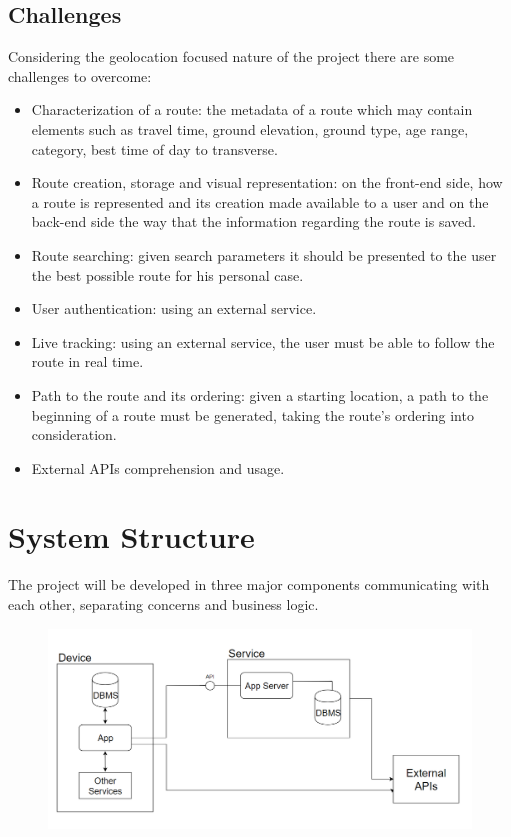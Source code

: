 \documentclass{article}
\begin{document}
        \subsection{Challenges}
            
            Considering the geolocation focused nature of the project there are some challenges to overcome:

            \begin{itemize}
                \item Characterization of a route: the metadata of a route which may contain elements such as travel time, ground elevation, ground type, age range, category, best time of day to transverse.
                \item Route creation, storage and visual representation: on the front-end side, how a route is represented and its creation made available to a user and on the back-end side the way that the information regarding the route is saved.
                \item Route searching: given search parameters it should be presented to the user the best possible route for his personal case.  
                \item User authentication: using an external service.
                \item Live tracking: using an external service, the user must be able to follow the route in real time.
                \item Path to the route and its ordering: given a starting location, a path to the beginning of a route must be generated, taking the route's ordering into consideration.
                \item External APIs comprehension and usage.
            \end{itemize}

    \section{System Structure}
        The project will be developed in three major components communicating with each other, separating concerns and business logic.
        
        \begin{figure}[h]            
            \includegraphics[width=\textwidth]{images/project-structure/system-structure.PNG}
        \end{figure}  
\end{document}
